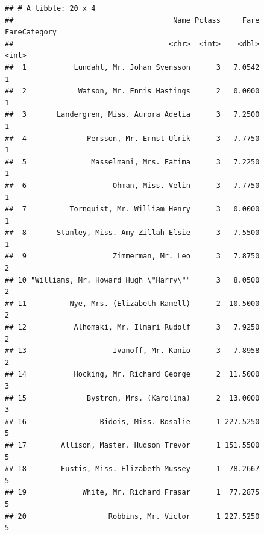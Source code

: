 \documentclass[]{book}
\newenvironment{Shaded}{\begin{snugshade}}{\end{snugshade}}
\newcommand{\KeywordTok}[1]{\textcolor[rgb]{0.13,0.29,0.53}{\textbf{#1}}}
\newcommand{\DataTypeTok}[1]{\textcolor[rgb]{0.13,0.29,0.53}{#1}}
\newcommand{\DecValTok}[1]{\textcolor[rgb]{0.00,0.00,0.81}{#1}}
\newcommand{\StringTok}[1]{\textcolor[rgb]{0.31,0.60,0.02}{#1}}
\newcommand{\CommentTok}[1]{\textcolor[rgb]{0.56,0.35,0.01}{\textit{#1}}}
\newcommand{\OperatorTok}[1]{\textcolor[rgb]{0.81,0.36,0.00}{\textbf{#1}}}
\newcommand{\NormalTok}[1]{#1}
\theoremstyle{definition}
\theoremstyle{definition}
\theoremstyle{definition}
\theoremstyle{remark}
\begin{document}
\begin{Shaded}
\end{Shaded}

\begin{verbatim}
## # A tibble: 20 x 4
##                                     Name Pclass     Fare FareCategory
##                                    <chr>  <int>    <dbl>        <int>
##  1           Lundahl, Mr. Johan Svensson      3   7.0542            1
##  2            Watson, Mr. Ennis Hastings      2   0.0000            1
##  3       Landergren, Miss. Aurora Adelia      3   7.2500            1
##  4              Persson, Mr. Ernst Ulrik      3   7.7750            1
##  5               Masselmani, Mrs. Fatima      3   7.2250            1
##  6                    Ohman, Miss. Velin      3   7.7750            1
##  7          Tornquist, Mr. William Henry      3   0.0000            1
##  8       Stanley, Miss. Amy Zillah Elsie      3   7.5500            1
##  9                    Zimmerman, Mr. Leo      3   7.8750            2
## 10 "Williams, Mr. Howard Hugh \"Harry\""      3   8.0500            2
## 11          Nye, Mrs. (Elizabeth Ramell)      2  10.5000            2
## 12           Alhomaki, Mr. Ilmari Rudolf      3   7.9250            2
## 13                    Ivanoff, Mr. Kanio      3   7.8958            2
## 14           Hocking, Mr. Richard George      2  11.5000            3
## 15              Bystrom, Mrs. (Karolina)      2  13.0000            3
## 16                 Bidois, Miss. Rosalie      1 227.5250            5
## 17        Allison, Master. Hudson Trevor      1 151.5500            5
## 18        Eustis, Miss. Elizabeth Mussey      1  78.2667            5
## 19             White, Mr. Richard Frasar      1  77.2875            5
## 20                   Robbins, Mr. Victor      1 227.5250            5
\end{verbatim}
\end{document}
